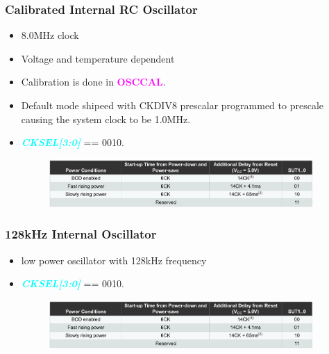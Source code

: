 \documentclass{article}
\newcommand{\bitFormat}[1]{\emph{\textbf{\textcolor{cyan}{#1}}}}
\newcommand{\regFormat}[1]{\textbf{\textcolor{magenta}{#1}}}
\begin{document}
\subsubsection{Calibrated Internal RC Oscillator}
\begin{itemize}
    \item 8.0MHz clock
    \item Voltage and temperature dependent
    \item Calibration is done in \regFormat{OSCCAL}.
    \item Default mode shipeed with CKDIV8 prescalar programmed to prescale causing the system clock to be 1.0MHz.
    \item \bitFormat{CKSEL[3:0]} == 0010.
    \begin{figure}[H]
        \begin{center}
            \includegraphics[width=0.95\textwidth]{startUpTimeCalibratedInternalRCOscillator.png}
        \end{center}
    \end{figure}
\end{itemize}

\subsubsection{128kHz Internal Oscillator}
\begin{itemize}
    \item low power oscillator with 128kHz frequency
    \item \bitFormat{CKSEL[3:0]} == 0010.
    \begin{figure}[H]
        \begin{center}
            \includegraphics[width=0.95\textwidth]{startUpTimeCalibratedInternalRCOscillator.png}
        \end{center}
    \end{figure}
\end{itemize}
\end{document}
